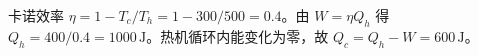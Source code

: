 卡诺效率 $\eta=1-T_c/T_h=1-300/500=0.4$。由 $W=\eta Q_h$ 得 $Q_h=400/0.4=1000\,\mathrm J$。热机循环内能变化为零，故 $Q_c=Q_h-W=600\,\mathrm J$。
